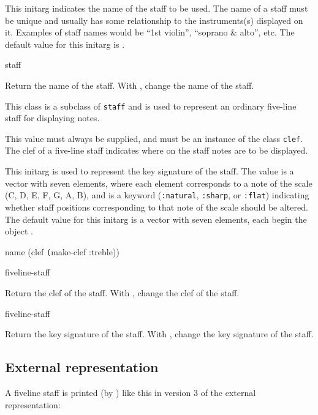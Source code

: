 
This initarg indicates the name of the staff to be used.  The name of
a staff must be unique and usually has some relationship to the
instruments(s) displayed on it.  Examples of staff names would be
``1st violin'', ``soprano \& alto'', etc.  The default value for this
initarg is .

 {staff}

Return the name of the staff.  With , change the name of
the staff.


This class is a subclass of \texttt{staff} and is used to represent an
ordinary five-line staff for displaying notes. 


This value must always be supplied, and must be an instance of the
class \texttt{clef}.  The clef of a five-line staff indicates where
on the staff notes are to be displayed.  


This initarg is used to represent the key signature of the staff.  The
value is a vector with seven elements, where each element corresponds
to a note of the scale (C, D, E, F, G, A, B), and is a keyword
(\texttt{:natural}, \texttt{:sharp}, or \texttt{:flat}) indicating
whether staff positions corresponding to that note of the scale should
be altered.  The default value for this initarg is a vector with seven
elements, each begin the object .

 {name \optional (clef \texttt(make-clef :treble))}

 {fiveline-staff}

Return the clef of the staff.  With , change the clef of
the staff.

 {fiveline-staff}

Return the key signature of the staff.  With , change
the key signature of the staff. 

\subsection{External representation}

A fiveline staff is printed (by ) like this in
version 3 of the external representation:

